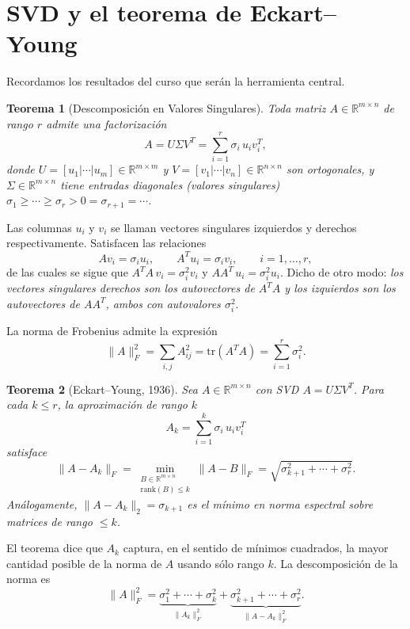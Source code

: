 \documentclass[12pt]{article}
\newtheorem{theorem}{Teorema}
\newcommand{\R}{\mathbb{R}}
\newcommand{\rank}{\mathrm{rank}}
\newcommand{\tr}{\mathrm{tr}}
\begin{document}
\section{SVD y el teorema de Eckart--Young}

Recordamos los resultados del curso que serán la herramienta central.

\begin{theorem}[Descomposición en Valores Singulares]
Toda matriz $A \in \R^{m \times n}$ de rango $r$ admite una factorización
\[
  A = U \Sigma V^T = \sum_{i=1}^r \sigma_i\, u_i v_i^T,
\]
donde $U = [u_1 | \cdots | u_m] \in \R^{m \times m}$ y $V = [v_1 | \cdots | v_n] \in \R^{n \times n}$ son ortogonales, y $\Sigma \in \R^{m \times n}$ tiene entradas diagonales (valores singulares) $\sigma_1 \geq \cdots \geq \sigma_r > 0 = \sigma_{r+1} = \cdots$.
\end{theorem}

Las columnas $u_i$ y $v_i$ se llaman vectores singulares izquierdos y derechos respectivamente. Satisfacen las relaciones
\[
  A v_i = \sigma_i u_i, \qquad A^T u_i = \sigma_i v_i, \qquad i = 1, \ldots, r,
\]
de las cuales se sigue que $A^TA \, v_i = \sigma_i^2 v_i$ y $AA^T \, u_i = \sigma_i^2 u_i$. Dicho de otro modo: \emph{los vectores singulares derechos son los autovectores de $A^TA$ y los izquierdos son los autovectores de $AA^T$, ambos con autovalores $\sigma_i^2$}.

La norma de Frobenius admite la expresión
\[
  \|A\|_F^2 = \sum_{i,j} A_{ij}^2 = \tr(A^TA) = \sum_{i=1}^r \sigma_i^2.
\]

\begin{theorem}[Eckart--Young, 1936]
Sea $A \in \R^{m \times n}$ con SVD $A = U\Sigma V^T$. Para cada $k \leq r$, la aproximación de rango $k$
\[
  A_k = \sum_{i=1}^k \sigma_i\, u_i v_i^T
\]
satisface
\[
  \|A - A_k\|_F = \min_{\substack{B \in \R^{m\times n} \\ \rank(B) \leq k}} \|A - B\|_F = \sqrt{\sigma_{k+1}^2 + \cdots + \sigma_r^2}.
\]
Análogamente, $\|A - A_k\|_2 = \sigma_{k+1}$ es el mínimo en norma espectral sobre matrices de rango $\leq k$.
\end{theorem}

El teorema dice que $A_k$ captura, en el sentido de mínimos cuadrados, la mayor cantidad posible de la norma de $A$ usando sólo rango $k$. La descomposición de la norma es
\[
  \|A\|_F^2 = \underbrace{\sigma_1^2 + \cdots + \sigma_k^2}_{\|A_k\|_F^2} + \underbrace{\sigma_{k+1}^2 + \cdots + \sigma_r^2}_{\|A - A_k\|_F^2}.
\]
\end{document}

